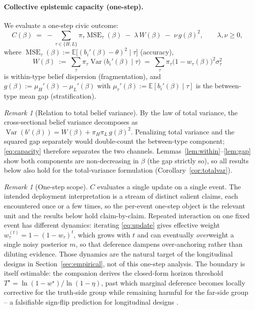 \documentclass[11pt]{article}
\theoremstyle{definition}
\theoremstyle{remark}
\newtheorem{remark}[theorem]{Remark}
\numberwithin{equation}{section}
\DeclareMathOperator{\MSE}{MSE}
\DeclareMathOperator{\Var}{Var}
\newcommand{\E}{\mathbb{E}}
\begin{document}
\paragraph{Collective epistemic capacity (one-step).} We evaluate a one-step civic outcome:
\begin{equation}\label{eq:capacity}
C(\beta) \;=\; -\sum_{\tau \in \{H,L\}} \pi_\tau \MSE_\tau(\beta)
\;-\; \lambda\, W(\beta)
\;-\; \nu\, g(\beta)^2,
\qquad \lambda, \nu \ge 0,
\end{equation}
where $\MSE_\tau(\beta) := \E\bigl[(b_i'(\beta)-\theta)^2 \mid \tau\bigr]$ (accuracy),
\[
W(\beta) \;:=\; \sum_{\tau} \pi_\tau \Var\!\bigl(b_i'(\beta) \mid \tau\bigr)
\;=\; \sum_{\tau} \pi_\tau \bigl(1 - w_\tau(\beta)\bigr)^2 \sigma_\tau^2
\]
is within-type belief dispersion (fragmentation), and $g(\beta) := \mu_H'(\beta) - \mu_L'(\beta)$ with $\mu_\tau'(\beta) := \E[b_i'(\beta) \mid \tau]$ is the between-type mean gap (stratification).

\begin{remark}[Relation to total belief variance]\label{rem:variance}
By the law of total variance, the cross-sectional belief variance decomposes as $\Var(b'(\beta)) = W(\beta) + \pi_H \pi_L\, g(\beta)^2$. Penalizing total variance and the squared gap separately would double-count the between-type component; \eqref{eq:capacity} therefore separates the two channels. Lemmas~\ref{lem:within}--\ref{lem:gap} show both components are non-decreasing in $\beta$ (the gap strictly so), so all results below also hold for the total-variance formulation (Corollary~\ref{cor:totalvar}).
\end{remark}

\begin{remark}[One-step scope]\label{rem:onestep}
$C$ evaluates a single update on a single event. The intended deployment interpretation is a stream of distinct salient claims, each encountered once or a few times, so the per-event one-step object is the relevant unit and the results below hold claim-by-claim. Repeated interaction on one fixed event has different dynamics: iterating \eqref{eq:update} gives effective weight $w_\tau^{(t)} = 1-(1-w_\tau)^t$, which grows with $t$ and can eventually \emph{over}weight a single noisy posterior $m$, so that deference dampens over-anchoring rather than diluting evidence. Those dynamics are the natural target of the longitudinal designs in Section~\ref{sec:empirical}, not of this one-step analysis. The boundary is itself estimable: the companion derives the closed-form horizon threshold $T^\star = \ln(1-w^\star)/\ln(1-\eta)$, past which marginal deference becomes locally corrective for the truth-side group while remaining harmful for the far-side group -- a falsifiable sign-flip prediction for longitudinal designs \citep{hofheinz2026drift}.
\end{remark}
\end{document}
